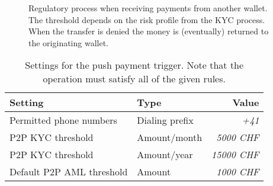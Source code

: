 \begin{figure}[h!]
\begin{center}
  \end{center}
  \caption{Regulatory process when receiving payments from another wallet.
    The threshold depends on the risk profile from the KYC process.
    When the transfer is denied the money is (eventually) returned to
    the originating wallet.}
\end{figure}


\begin{table}[h!]
  \caption{Settings for the push payment trigger. Note that the operation
  must satisfy all of the given rules.}
  \begin{tabular}{l|l|r}
    {\bf Setting}             & {\bf Type}     & {\bf Value} \\ \hline \hline
    Permitted phone numbers   & Dialing prefix & {\em +41} \\
    P2P KYC threshold         & Amount/month   & {\em  5000 CHF} \\
    P2P KYC threshold         & Amount/year    & {\em 15000 CHF} \\
    Default P2P AML threshold & Amount         & {\em  1000 CHF} \\
  \end{tabular}
\end{table}
